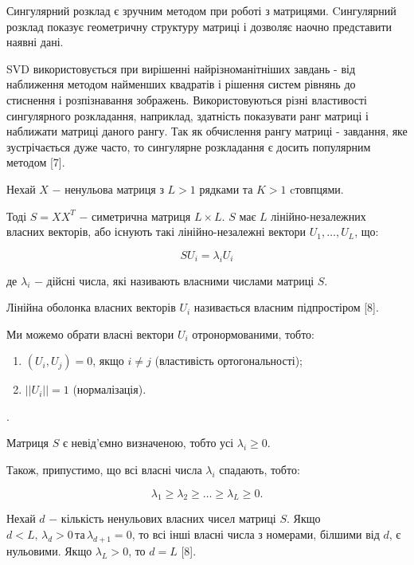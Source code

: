 Сингулярний розклад є зручним методом при роботі з матрицями. Cингулярний розклад показує геометричну структуру матриці і дозволяє наочно представити наявні дані. 

SVD використовується при вирішенні найрізноманітніших завдань - від наближення методом найменших квадратів і рішення систем рівнянь до стиснення і розпізнавання зображень. Використовуються різні властивості сингулярного розкладання, наприклад, здатність показувати ранг матриці і наближати матриці даного рангу. Так як обчислення рангу матриці - завдання, яке зустрічається дуже часто, то сингулярне розкладання є досить популярним методом [7].

Нехай $X$ $-$ ненульова матриця з $L > 1$ рядками та $K > 1$ cтовпцями.

Тоді $S = XX^{T}$ $-$ симетрична матриця $L \times L$. $S$ має $L$ лінійно-незалежних власних векторів, або існують такі лінійно-незалежні вектори $U_{1}, \dots, U_{L}$, що:

\[
SU_{i} = \lambda_{i}U_{i}
\]

\noindent де $\lambda_{i}$ $-$ дійсні числа, які називають власними числами матриці $S$. 

\vspace{1.5em}

Лінійна оболонка власних векторів $U_{i}$ називається власним підпростіром [8].

Ми можемо обрати власні вектори $U_{i}$ отронормованими, тобто:

\begin{enumerate}
	\item $(U_{i}, U_{j}) = 0$, якщо $i \ne j$ (властивість ортогональності);
	\item $||U_{i}|| = 1$ (нормалізація).
\end{enumerate}.

Матриця $S$ є невід'ємно визначеною, тобто усі $\lambda_{i} \ge 0$.

Також, припустимо, що всі власні числа $\lambda_{i}$ спадають, тобто: 

\begin{equation}
\lambda_{1} \ge \lambda_{2} \ge \dots \ge \lambda_{L} \ge 0.
\end{equation}

Нехай $d$ $-$ кількість ненульових власних чисел матриці $S$. Якщо $d < L, \, \lambda_{d} > 0 \, \text{та} \, \lambda_{d+1} = 0$, то всі інші власні числа з номерами, білшими від $d$, є нульовими. Якщо $\lambda_{L} > 0$, то $d = L$ [8]. 

